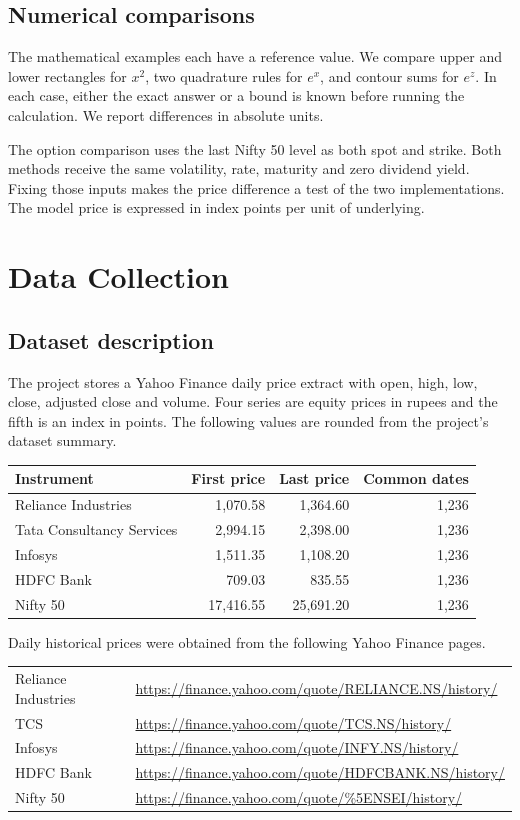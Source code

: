 \documentclass[12pt,a4paper]{article}
\newcommand{\chapterpage}[1]{\clearpage\section{#1}}
\begin{document}
\subsection{Numerical comparisons}
The mathematical examples each have a reference value. We compare upper and lower rectangles for $x^2$, two quadrature rules for $e^x$, and contour sums for $e^z$. In each case, either the exact answer or a bound is known before running the calculation. We report differences in absolute units.
 
The option comparison uses the last Nifty 50 level as both spot and strike. Both methods receive the same volatility, rate, maturity and zero dividend yield. Fixing those inputs makes the price difference a test of the two implementations. The model price is expressed in index points per unit of underlying.
\chapterpage{Data Collection}
\subsection{Dataset description}
The project stores a Yahoo Finance daily price extract with open, high, low, close, adjusted close and volume. Four series are equity prices in rupees and the fifth is an index in points. The following values are rounded from the project's dataset summary.
\begin{center}\begin{tabular}{lrrr}\toprule
Instrument & First price & Last price & Common dates\\\midrule
Reliance Industries & 1,070.58 & 1,364.60 & 1,236\\
Tata Consultancy Services & 2,994.15 & 2,398.00 & 1,236\\
Infosys & 1,511.35 & 1,108.20 & 1,236\\
HDFC Bank & 709.03 & 835.55 & 1,236\\
Nifty 50 & 17,416.55 & 25,691.20 & 1,236\\\bottomrule
\end{tabular}\par\nopagebreak{}\end{center}
Daily historical prices were obtained from the following Yahoo Finance pages.

{\small\begin{tabular}{@{}ll@{}}
Reliance Industries & \url{https://finance.yahoo.com/quote/RELIANCE.NS/history/}\\
TCS & \url{https://finance.yahoo.com/quote/TCS.NS/history/}\\
Infosys & \url{https://finance.yahoo.com/quote/INFY.NS/history/}\\
HDFC Bank & \url{https://finance.yahoo.com/quote/HDFCBANK.NS/history/}\\
Nifty 50 & \url{https://finance.yahoo.com/quote/%5ENSEI/history/}\\
\end{tabular}}
\end{document}
